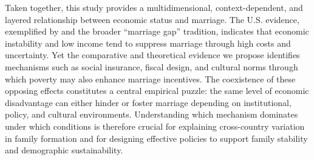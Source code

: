Taken together, this study provides a multidimensional, context-dependent, and layered relationship between economic status and marriage. The U.S. evidence, exemplified by \citet{GarciaHeckman2023} and the broader ``marriage gap'' tradition, indicates that economic instability and low income tend to suppress marriage through high costs and uncertainty. Yet the comparative and theoretical evidence we propose identifies mechanisms such as social insurance, fiscal design, and cultural norms through which poverty may also enhance marriage incentives. The coexistence of these opposing effects constitutes a central empirical puzzle: the same level of economic disadvantage can either hinder or foster marriage depending on institutional, policy, and cultural environments. Understanding which mechanism dominates under which conditions is therefore crucial for explaining cross-country variation in family formation and for designing effective policies to support family stability and demographic sustainability.
\newpage






